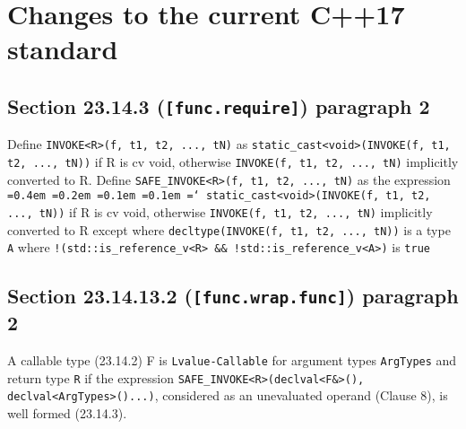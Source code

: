 \documentclass{article}
\newcommand*\justify{%
  \fontdimen2\font=0.4em%
  \fontdimen3\font=0.2em%
  \fontdimen4\font=0.1em%
  \fontdimen7\font=0.1em%
  \hyphenchar\font=`\-%
}
\begin{document}
\section{Changes to the current C++17 standard}
\subsection{Section 23.14.3 (\texttt{[func.require]}) paragraph 2}
Define \texttt{INVOKE<R>(f, t1, t2, ..., tN)} as
\texttt{static\_cast<void>(INVOKE(f, t1, t2, ..., tN))} if R is cv void,
otherwise \texttt{INVOKE(f, t1, t2, ..., tN)} implicitly converted to R.
Define \texttt{SAFE\_INVOKE<R>(f, t1, t2, ..., tN)} as the expression
\texttt{\justify static\_cast<void>(INVOKE(f, t1, t2, ..., tN))} if R is cv
void, otherwise \texttt{INVOKE(f, t1, t2, ..., tN)} implicitly converted to R
except where \texttt{decltype(INVOKE(f, t1, t2, ..., tN))} is a type
\texttt{A} where \texttt{!(std::is\_reference\_v<R> &&
!std::is\_reference\_v<A>)} is \texttt{true}

\subsection{Section 23.14.13.2 (\texttt{[func.wrap.func]}) paragraph 2}
A callable type (23.14.2) F is \texttt{Lvalue-Callable} for argument types
\texttt{ArgTypes} and return type \texttt{R} if the expression
\texttt{SAFE\_INVOKE<R>(declval<F&>(), declval<ArgTypes>()...)}, considered as
an unevaluated operand (Clause 8), is well formed (23.14.3).
\end{document}
